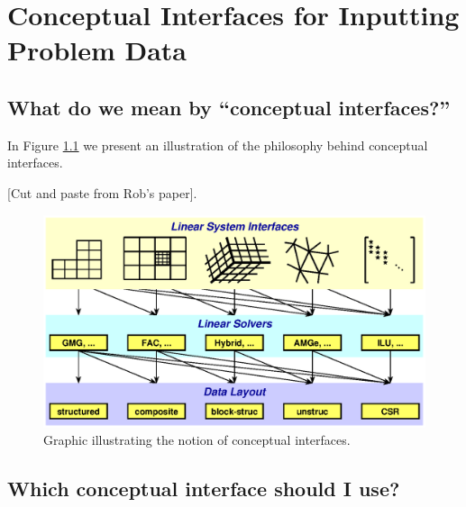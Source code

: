 \chapter{Conceptual Interfaces for Inputting Problem Data}
\label{Conceptual Interfaces}

\section{What do we mean by ``conceptual interfaces?''}

In Figure \ref{fig-conceptual-interface} we present an illustration
of the philosophy behind conceptual interfaces.

[Cut and paste from Rob's paper].

\begin{figure}
\centering
\includegraphics[width=5in]{concep_iface.eps}
\caption{%
Graphic illustrating the notion of conceptual interfaces.}
\label{fig-conceptual-interface}
\end{figure}

\section{Which conceptual interface should I use?}

